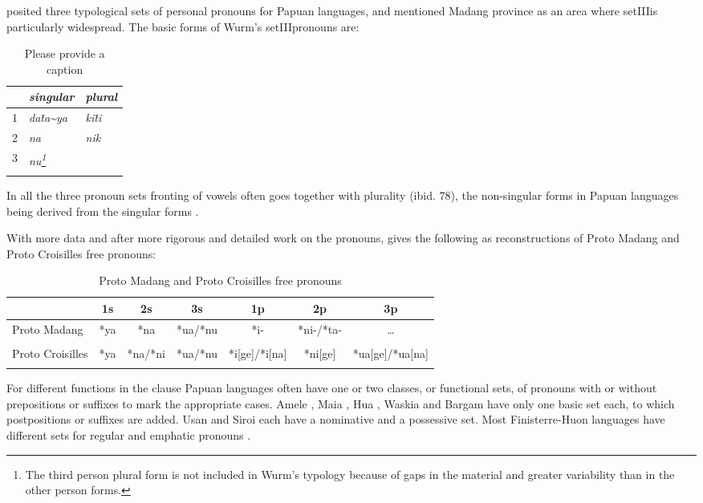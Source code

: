 \citet{Wurm1982} posited three typological sets of personal pronouns for Papuan languages, and mentioned Madang province as an area where set\textsc{III}is particularly widespread. The basic forms of Wurm's set\textsc{III}pronouns are:

\begin{table}
\caption{Please provide a caption}
\label{} 
\begin{tabular}{l>{\itshape}l>{\itshape}l}
\mytoprule
 &\upshape singular &\upshape plural\\
\midrule
1 &da\~{ta\~{}ya} &ki\~{ti}\\
2 &na &nik\\
3 &nu\footnote{The third person plural form is not included in Wurm's typology because of gaps in the material and greater variability than in the other person forms.} &\citep[40--42]{Wurm1982}\\
\mybottomrule
\end{tabular}
\end{table}


In all the three pronoun sets fronting of vowels often goes together with plurality (ibid. 78), the non-singular forms in Papuan languages being derived from the singular forms \citep[361]{Franklin1979}. 

With more data and after more rigorous and detailed work on the  pronouns, \citet[5]{Ross1995} gives the following as reconstructions of Proto Madang and Proto Croisilles free pronouns:

\begin{table}
\begin{tabular}{lcccccc}
\mytoprule
 & 1s & 2s & 3s & 1p & 2p & 3p\\ 
\midrule
\midrule
\parbox{1.1cm}{Proto Madang} & *ya & *na & *ua/*nu & *i- & *ni-/*ta- & {\dots}\\ 
\\
\parbox{1.1cm}{Proto Croisilles} & *ya & *na/*ni & *ua/*nu & *i[ge]/*i[na] & *ni[ge] & *ua[ge]/*ua[na]\\
\mybottomrule
\mybottomrule
\end{tabular}
\caption{Proto Madang and Proto Croisilles free pronouns}
\label{tab:8}
\end{table}

For different functions in the clause Papuan languages often have one or two classes, or functional sets, of pronouns with or without prepositions or suffixes to mark the appropriate cases. Amele \citep{Roberts1987}, Maia \citep[71]{Hardin2002}, Hua \citep[215]{Haiman1980}, Waskia \citep[53]{RossEtAl1978}%
 and Bargam \citep[29]{Hepner2002} have only one basic set each, to which postpositions or suffixes are added. Usan \citep{Reesink1987} and Siroi \citep{Wells1979} each have a nominative and a possessive set. Most Finisterre-Huon languages have different sets for regular and emphatic pronouns \citep{McElhanon1973}.

